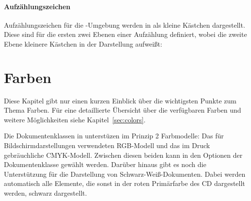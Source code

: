 \begin{desctable}
\end{desctable}


\paragraph{Aufzählungszeichen}

Aufzählungszeichen für die -Umgebung werden in \tubslatex
als kleine Kästchen dargestellt.
Diese sind für die ersten zwei Ebenen einer Aufzählung definiert, wobei
die zweite Ebene kleinere Kästchen in der Darstellung aufweißt:
\begin{center}
\end{center}



\section{Farben}

Diese Kapitel gibt nur einen kurzen Einblick über die wichtigsten Punkte
zum Thema Farben. Für eine detaillierte Übersicht über die verfügbaren Farben
und weitere Möglichkeiten siehe Kapitel~\ref{sec:colors}.%

Die Dokumentenklassen in \tubslatex unterstüzen im Prinzip 2 Farbmodelle:
Das für Bildschirmdarstellungen verwendeten RGB-Modell und das im
Druck gebräuchliche CMYK-Modell. Zwischen diesen beiden kann in den Optionen
der Dokumentenklasse gewählt werden. Darüber hinaus gibt es noch die Unterstützung
für die Darstellung von Schwarz-Weiß-Dokumenten. Dabei werden automatisch
alle Elemente, die sonst in der roten Primärfarbe des CD dargestellt werden,
schwarz dargestellt.

